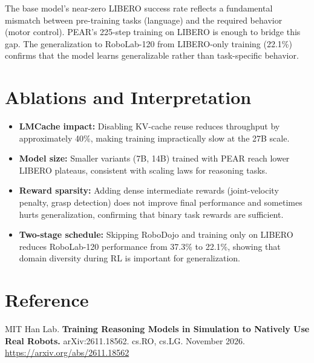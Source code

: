 \documentclass[10pt,twocolumn]{article}
\begin{document}
The base model's near-zero LIBERO success rate reflects a fundamental mismatch between pre-training tasks (language) and the required behavior (motor control).
PEAR's 225-step training on LIBERO is enough to bridge this gap.
The generalization to RoboLab-120 from LIBERO-only training (22.1\%) confirms that the model learns generalizable rather than task-specific behavior.

\section{Ablations and Interpretation}

\begin{itemize}[leftmargin=1em,itemsep=2pt]
  \item \textbf{LMCache impact:} Disabling KV-cache reuse reduces throughput by approximately 40\%, making training impractically slow at the 27B scale.
  \item \textbf{Model size:} Smaller variants (7B, 14B) trained with PEAR reach lower LIBERO plateaus, consistent with scaling laws for reasoning tasks.
  \item \textbf{Reward sparsity:} Adding dense intermediate rewards (joint-velocity penalty, grasp detection) does not improve final performance and sometimes hurts generalization, confirming that binary task rewards are sufficient.
  \item \textbf{Two-stage schedule:} Skipping RoboDojo and training only on LIBERO reduces RoboLab-120 performance from 37.3\% to 22.1\%, showing that domain diversity during RL is important for generalization.
\end{itemize}

\section*{Reference}
MIT Han Lab.
\textbf{Training Reasoning Models in Simulation to Natively Use Real Robots.}
arXiv:2611.18562. cs.RO, cs.LG. November 2026.
\url{https://arxiv.org/abs/2611.18562}
\end{document}
